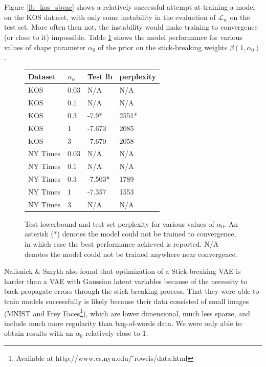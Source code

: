 \documentclass{report}
\begin{document}
	Figure \ref{lb_kos_sbvae} shows a relatively successful attempt at training a model on the KOS dataset, with only some instability in the evaluation of $\tilde{\mathcal{L}}_w$ on the test set. More often then not, the instability would make training to convergence (or close to it) impossible. Table \ref{sb_res_table} shows the model performance for various values of shape parameter $\alpha_0$ of the prior on the stick-breaking weights $\beta(1,\alpha_0)$. \\
	\begin{figure}%
		\centering
		\begin{tabular}{l|l|l|l}
			Dataset 	& $\alpha_0$ & Test lb 	& perplexity  \\ \hline
			KOS 		& 0.03		& N/A		&  N/A	\\
			KOS 		& 0.1		& N/A		&  N/A	\\
			KOS 		& 0.3		& -7.9*		&  2551*\\
			KOS 		& 1			& -7.673	&  2085	\\
			KOS 		& 3			& -7.670	&  2058	\\ \hline
			NY Times 	& 0.03		& N/A		& N/A	\\
			NY Times 	& 0.1		& N/A		& N/A	\\
			NY Times 	& 0.3		& -7.503*	& 1789	\\
			NY Times 	& 1			& -7.357	& 1553	\\
			NY Times 	& 3			& N/A		& N/A	\\
		\end{tabular}
		\caption{Test lowerbound and test set perplexity for various values of $\alpha_0$. An asterisk (*) denotes the model could not be trained to convergence, in which case the best performance achieved is reported. N/A denotes the model could not be trained anywhere near convergence.}
		\label{sb_res_table}
	\end{figure}


	Nalisnick \& Smyth \cite{nalisnick2016deep} also found that optimization of a Stick-breaking VAE is harder than a VAE with Gaussian latent variables because of the necessity to back-propagate errors through the stick-breaking process. That they were able to train models successfully is likely because their data consisted of small images (MNIST and Frey Faces\footnote{Available at http://www.cs.nyu.edu/ ̃roweis/data.html}), which are lower dimensional, much less sparse, and include much more regularity than bag-of-words data. We were only able to obtain results with an $\alpha_0$ relatively close to 1.
	
\end{document}

